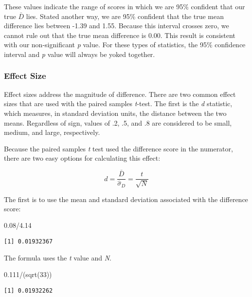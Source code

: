 \documentclass[
  11pt,
]{book}
\newenvironment{Shaded}{\begin{snugshade}}{\end{snugshade}}
\newcommand{\DecValTok}[1]{\textcolor[rgb]{0.00,0.00,0.81}{#1}}
\newcommand{\FloatTok}[1]{\textcolor[rgb]{0.00,0.00,0.81}{#1}}
\newcommand{\FunctionTok}[1]{\textcolor[rgb]{0.00,0.00,0.00}{#1}}
\newcommand{\NormalTok}[1]{#1}
\newcommand{\SpecialCharTok}[1]{\textcolor[rgb]{0.00,0.00,0.00}{#1}}
\begin{document}
These values indicate the range of scores in which we are 95\% confident that our true \(\bar{D}\) lies. Stated another way, we are 95\% confident that the true mean difference lies between -1.39 and 1.55. Because this interval crosses zero, we cannot rule out that the true mean difference is 0.00. This result is consistent with our non-significant \emph{p} value. For these types of statistics, the 95\% confidence interval and \emph{p} value will always be yoked together.

\hypertarget{effect-size-2}{%
\subsubsection{Effect Size}\label{effect-size-2}}

Effect sizes address the magnitude of difference. There are two common effect sizes that are used with the paired samples \emph{t}-test. The first is the \emph{d} statistic, which measures, in standard deviation units, the distance between the two means. Regardless of sign, values of .2, .5, and .8 are considered to be small, medium, and large, respectively.

Because the paired samples \emph{t} test used the difference score in the numerator, there are two easy options for calculating this effect:

\[d=\frac{\bar{D}}{\hat\sigma_D}=\frac{t}{\sqrt{N}}\]

The first is to use the mean and standard deviation associated with the difference score:

\begin{Shaded}
\begin{Highlighting}[]
\FloatTok{0.08}\SpecialCharTok{/}\FloatTok{4.14}
\end{Highlighting}
\end{Shaded}

\begin{verbatim}
[1] 0.01932367
\end{verbatim}

The formula uses the \emph{t} value and \emph{N}.

\begin{Shaded}
\begin{Highlighting}[]
\FloatTok{0.111}\SpecialCharTok{/}\NormalTok{(}\FunctionTok{sqrt}\NormalTok{(}\DecValTok{33}\NormalTok{))}
\end{Highlighting}
\end{Shaded}

\begin{verbatim}
[1] 0.01932262
\end{verbatim}
\end{document}
